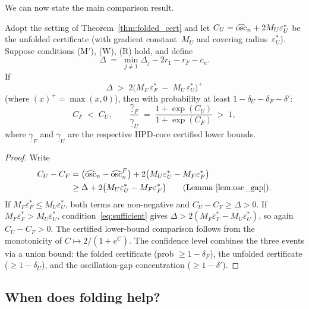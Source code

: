 We can now state the main comparison result.

\begin{theorem}\label{thm:gap_improvement}
  Adopt the setting of Theorem~\ref{thm:folded_cert} and let
  $C_U = \widehat{\mathrm{osc}}_n + 2 M_U \varepsilon_U^*$ be the unfolded
  certificate (with gradient constant~$M_U$ and covering
  radius~$\varepsilon_U^*$).
  Suppose conditions \textup{(M$'$)}, \textup{(W)}, \textup{(R)}
  hold, and define
  \[
    \Delta
    \;=\;
    \min_{j \neq 1}\Delta_j - 2r_1 - r_F - c_n.
  \]
  If
  \begin{equation}\label{eq:sufficient}
    \Delta
    \;>\;
    2\bigl(M_F\,\varepsilon_F^*
    \;-\; M_U\,\varepsilon_U^*\bigr)^{\!+}
  \end{equation}
  (where $(x)^+ = \max(x,0)$), then with probability at least
  $1 - \delta_U - \delta_F - \delta'$:
  \begin{equation}\label{eq:C_comparison}
    C_F \;<\; C_U,
    \qquad
    \frac{\underline{\gamma}_F}{\underline{\gamma}_U}
    \;=\;
    \frac{1 + \exp(C_U)}{1 + \exp(C_F)}
    \;>\; 1,
  \end{equation}
  where $\underline{\gamma}_F$ and $\underline{\gamma}_U$ are the
  respective HPD-core certified lower bounds.
\end{theorem}

\begin{proof}
  Write
  \begin{align*}
    C_U - C_F
    &= \bigl(\widehat{\mathrm{osc}}_n - \widehat{\mathrm{osc}}_n^F\bigr)
       + 2\bigl(M_U\varepsilon_U^* - M_F\varepsilon_F^*\bigr) \\
    &\geq \Delta + 2\bigl(M_U\varepsilon_U^* - M_F\varepsilon_F^*\bigr)
      \qquad\text{(Lemma~\ref{lem:osc_gap})}.
  \end{align*}
  If $M_F\varepsilon_F^* \leq M_U\varepsilon_U^*$, both terms are
  non-negative and $C_U - C_F \geq \Delta > 0$.
  If $M_F\varepsilon_F^* > M_U\varepsilon_U^*$,
  condition~\eqref{eq:sufficient} gives
  $\Delta > 2(M_F\varepsilon_F^* - M_U\varepsilon_U^*)$, so again
  $C_U - C_F > 0$.  The certified lower-bound comparison follows
  from the monotonicity of $C \mapsto 2/(1 + e^C)$.
  The confidence level combines the three events via a union bound:
  the folded certificate (prob $\geq 1 - \delta_F$), the unfolded
  certificate ($\geq 1 - \delta_U$), and the oscillation-gap
  concentration ($\geq 1 - \delta'$).
\end{proof}


\subsection{When does folding help?}
\label{sec:when_folding_helps}

